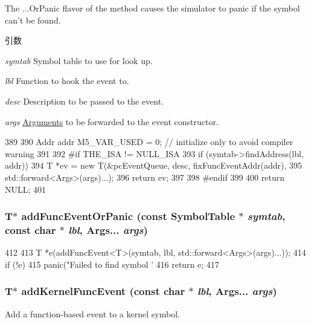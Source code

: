 The ...OrPanic flavor of the method causes the simulator to panic if the symbol can't be found.


\begin{DoxyParams}{引数}
\item[{\em symtab}]Symbol table to use for look up. \item[{\em lbl}]Function to hook the event to. \item[{\em desc}]Description to be passed to the event. \item[{\em args}]\hyperlink{classArguments}{Arguments} to be forwarded to the event constructor. \end{DoxyParams}



\begin{DoxyCode}
389     {
390         Addr addr M5_VAR_USED = 0; // initialize only to avoid compiler warning
391 
392 #if THE_ISA != NULL_ISA
393         if (symtab->findAddress(lbl, addr)) {
394             T *ev = new T(&pcEventQueue, desc, fixFuncEventAddr(addr),
395                           std::forward<Args>(args)...);
396             return ev;
397         }
398 #endif
399 
400         return NULL;
401     }
\end{DoxyCode}
\hypertarget{classSystem_a299ade3c625c503681f9b0f7a3812075}{
\subsubsection[{addFuncEventOrPanic}]{\setlength{\rightskip}{0pt plus 5cm}T$\ast$ addFuncEventOrPanic (const {\bf SymbolTable} $\ast$ {\em symtab}, \/  const char $\ast$ {\em lbl}, \/  Args... {\em args})}}
\label{classSystem_a299ade3c625c503681f9b0f7a3812075}



\begin{DoxyCode}
412     {
413         T *e(addFuncEvent<T>(symtab, lbl, std::forward<Args>(args)...));
414         if (!e)
415             panic("Failed to find symbol '%
416         return e;
417     }
\end{DoxyCode}
\hypertarget{classSystem_a87294b0dc6aa3e647f45e44a064269fb}{
\subsubsection[{addKernelFuncEvent}]{\setlength{\rightskip}{0pt plus 5cm}T$\ast$ addKernelFuncEvent (const char $\ast$ {\em lbl}, \/  Args... {\em args})}}
\label{classSystem_a87294b0dc6aa3e647f45e44a064269fb}
Add a function-\/based event to a kernel symbol.

